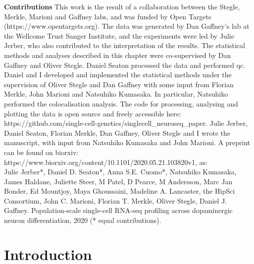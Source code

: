 \begin{Comment2}

\hspace{-3mm}\textbf{Contributions} This work is the result of a collaboration between the Stegle, Merkle, Marioni and Gaffney labs, and was funded by Open Targets 
(https://www.opentargets.org).
The data was generated by Dan Gaffney’s lab at the Wellcome Trust Sanger Institute, and the experiments were led by Julie Jerber, who also contributed to the interpretation of the results. 
The statistical methods and analyses described in this chapter were co-supervised by Dan Gaffney and Oliver Stegle. 
Daniel Seaton processed the data and performed \gls{qc}. 
Daniel and I developed and implemented the statistical methods under the supervision of Oliver Stegle and Dan Gaffney with some input from Florian Merkle, John Marioni and Natsuhiko Kumasaka.
In particular, Natsuhiko performed the colocalisation analysis.
The code for processing, analysing and plotting the data is open source and freely accessible here: https://github.com/single-cell-genetics/singlecell\_neuroseq\_paper.
Julie Jerber, Daniel Seaton, Florian Merkle, Dan Gaffney, Oliver Stegle and I wrote the manuscript, with input from Natsuhiko Kumasaka and John Marioni.
A preprint \cite{jerber2020population} can be found on biorxiv: https://www.biorxiv.org/content/10.1101/2020.05.21.103820v1, as:\\

Julie Jerber*, Daniel D. Seaton*, Anna S.E. Cuomo*, Natsuhiko Kumasaka, James Haldane, Juliette Steer, M Patel, D Pearce, M Andersson, Marc Jan Bonder, Ed Mountjoy, Maya Ghoussaini, Madeline A. Lancaster, the HipSci Consortium, John C. Marioni, Florian T. Merkle, Oliver Stegle, Daniel J. Gaffney. Population-scale single-cell RNA-seq profiling across dopaminergic neuron differentiation, 2020 (* equal contributions).

\end{Comment2}

\newpage

\section{Introduction}

